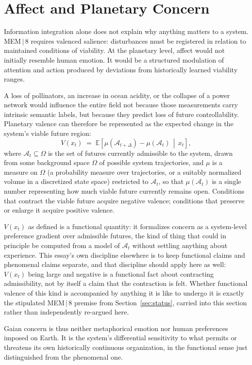 \documentclass[11pt]{article}
\begin{document}
\section{Affect and Planetary Concern}

Information integration alone does not explain why anything matters to a system. MEM\,$|$\,8 requires valenced salience: disturbances must be registered in relation to maintained conditions of viability. At the planetary level, affect would not initially resemble human emotion. It would be a structured modulation of attention and action produced by deviations from historically learned viability ranges.

A loss of pollinators, an increase in ocean acidity, or the collapse of a power network would influence the entire field not because those measurements carry intrinsic semantic labels, but because they predict loss of future controllability. Planetary valence can therefore be represented as the expected change in the system's viable future region:
\[
V(x_t) \;=\; \mathbb{E}\!\left[ \mu(\mathcal{A}_{t+\Delta}) - \mu(\mathcal{A}_t) \,\middle|\, x_t \right],
\]
where $\mathcal{A}_t\subseteq\Omega$ is the set of futures currently admissible to the system, drawn from some background space $\Omega$ of possible system trajectories, and $\mu$ is a measure on $\Omega$ (a probability measure over trajectories, or a suitably normalized volume in a discretized state space) restricted to $\mathcal{A}_t$, so that $\mu(\mathcal{A}_t)$ is a single number representing how much viable future currently remains open. Conditions that contract the viable future acquire negative valence; conditions that preserve or enlarge it acquire positive valence.

$V(x_t)$ as defined is a functional quantity: it formalizes concern as a system-level preference gradient over admissible futures, the kind of thing that could in principle be computed from a model of $\mathcal{A}_t$ without settling anything about experience. This essay's own discipline elsewhere is to keep functional claims and phenomenal claims separate, and that discipline should apply here as well: $V(x_t)$ being large and negative is a functional fact about contracting admissibility, not by itself a claim that the contraction is felt. Whether functional valence of this kind is accompanied by anything it is like to undergo it is exactly the stipulated MEM\,$|$\,8 premise from Section~\ref{sec:status}, carried into this section rather than independently re-argued here.

Gaian concern is thus neither metaphorical emotion nor human preferences imposed on Earth. It is the system's differential sensitivity to what permits or threatens its own historically continuous organization, in the functional sense just distinguished from the phenomenal one.
\end{document}
